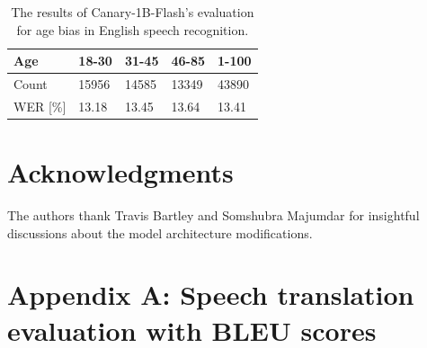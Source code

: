\documentclass[11pt]{article}
\begin{document}
\begin{table}
    \centering
    \begin{tabular}{|l|l|l|l|l|}
        \hline
        Age & 18-30 & 31-45 & 46-85 & 1-100 \\
        \hline
        Count & 15956 & 14585 & 13349 & 43890 \\
        WER [\%] & 13.18 & 13.45 & 13.64 & 13.41 \\
        \hline
    \end{tabular}
    \caption{The results of Canary-1B-Flash's evaluation for age bias in English speech recognition.}
    \label{tab:age_bias}
\end{table}


\section*{Acknowledgments}

The authors thank Travis Bartley and Somshubra Majumdar for insightful discussions about the model architecture modifications.




\appendix

\clearpage
\section{Appendix A: Speech translation evaluation with BLEU scores}
\label{sec:appendix_a}
\end{document}
